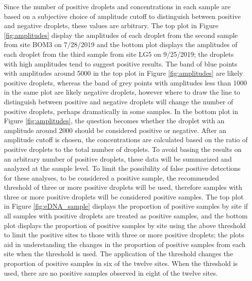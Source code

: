 \documentclass[12pt]{article}\usepackage[]{graphicx}\usepackage[]{color}
\begin{document}
\newpage 
Since the number of positive droplets and concentrations in each sample are based on a subjective choice of amplitude cutoff to distinguish between positive and negative droplets, these values are arbitrary. The top plot in Figure \ref{fig:amplitudes} display the amplitudes of each droplet from the second sample from site BOM3 on 7/28/2019 and the bottom plot displays the amplitudes of each droplet from the third sample from site LG5 on 9/25/2019; the droplets with high amplitudes tend to suggest positive results. The band of blue points with amplitudes around 5000 in the top plot in Figure \ref{fig:amplitudes} are likely positive droplets, whereas the band of grey points with amplitudes less than 1000 in the same plot are likely negative droplets, however where to draw the line to distinguish between positive and negative droplets will change the number of positive droplets, perhaps dramatically in some samples. In the bottom plot in Figure \ref{fig:amplitudes}, the question becomes whether the droplet with an amplitude around 2000 should be considered positive or negative. After an amplitude cutoff is chosen, the concentrations are calculated based on the ratio of positive droplets to the total number of droplets. To avoid basing the results on an arbitrary number of positive droplets, these data will be summarized and analyzed at the sample level. To limit the possibility of false positive detections for these analyses, to be considered a positive sample, the recommended threshold of three or more positive droplets will be used, therefore samples with three or more positive droplets will be considered positive samples. The top plot in Figure \ref{fig:eDNA_sample} displays the proportion of positive samples by site if all samples with positive droplets are treated as positive samples, and the bottom plot displays the proportion of positive samples by site using the above threshold to limit the positive sites to those with three or more positive droplets; the plots aid in understanding the changes in the proportion of positive samples from each site when the threshold is used. The application of the threshold changes the proportion of positive samples in six of the twelve sites. When the threshold is used, there are no positive samples observed in eight of the twelve sites. 
\end{document}
